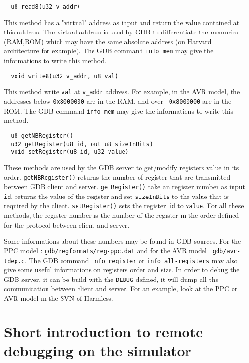 \begin{lstlisting}
  u8 read8(u32 v_addr)
\end{lstlisting}
This method has a "virtual" address as input and return the value contained at
this address. The virtual address is used by GDB to differentiate the memories
(RAM,ROM) which may have the same absolute address (on Harvard architecture for
example).
The GDB command {\tt info mem} may give the informations to write this method.

\begin{lstlisting}
  void write8(u32 v_addr, u8 val)
\end{lstlisting}
This method write {\tt val} at {\tt v\_addr} address. For example, in the AVR
model, the addresses below {\tt 0x8000000} are in the RAM, and over {\tt
0x8000000} are in the ROM.
The GDB command {\tt info mem} may give the informations to write this method.

\begin{lstlisting}
  u8 getNBRegister()
  u32 getRegister(u8 id, out u8 sizeInBits)
  void setRegister(u8 id, u32 value)
\end{lstlisting}

These methods are used by the GDB server to get/modify registers value in its order.
{\tt getNBRegister()} returns the number of register that are
transmitted between GDB client and server.
{\tt getRegister()} take an register number as
input {\tt id}, returns the value of the register and set
{\tt sizeInBits} to the value that is required by the
client. {\tt setRegister()} sets the register
{\tt id} to {\tt value}. For all these methods, the register number
is the number of the register in the order defined for the protocol between
client and server.

Some informations about these numbers may be found in  GDB sources. For the PPC
model : {\tt gdb/regformats/reg-ppc.dat} and for the AVR  model {\tt
gdb/avr-tdep.c}. The GDB command {\tt info register} or {\tt info all-registers}
may also give some useful informations on registers order and size. In order to
debug the GDB server, it can be build with the {\tt DEBUG} defined, it will dump
all the communication between client and server. For an example, look at the PPC
or AVR model in the SVN of Harmless.

\section{Short introduction to remote debugging on the simulator}

